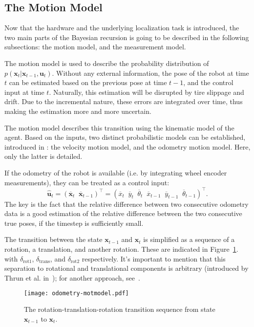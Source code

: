 \subsection{The Motion Model}\label{subsec:mot-model}
Now that the hardware and the underlying localization task is introduced, the two main parts of the
Bayesian recursion is going to be described in the following subsections: the motion model, and the measurement model.

The motion model is used to describe the probability distribution of
$p(\mathbf{x}_t | \mathbf{x}_{t-1},\mathbf{u}_t)$. \linebreak
Without any external information, the pose of the robot at time $t$ can be estimated based on the previous pose
at time $t-1$, and the control input at time $t$. Naturally, this estimation will be disrupted by tire slippage and drift.
Due to the incremental nature, these errors are integrated over time, thus making the estimation more and more
uncertain.

The motion model describes this transition using the kinematic model of the agent.
Based on the inputs, two distinct probabilistic models can be established, introduced in \cite{Thrun2005}: the velocity motion model,
and the odometry motion model. Here, only the latter is detailed.

If the odometry of the robot is available (i.e. by integrating wheel encoder measurements),
they can be treated as a control input:
\begin{equation}
    \hat{\mathbf{u}}_t = (\overline{\mathbf{x}}_t\;\;\overline{\mathbf{x}}_{t-1})^\top =
    \left(\overline{x}_t\;\;\overline{y}_t\;\;\overline{\theta}_t\;\;\overline{x}_{t-1}\;\;\overline{y}_{t-1}\;\;\overline{\theta}_{t-1}\right)^\top.
\end{equation}
The key is the fact that the relative difference between
two consecutive odometry data is a good estimation of the relative difference between
the two consecutive true poses, if the timestep is sufficiently small.

The transition between the state $\mathbf{x}_{t-1}$ and $\mathbf{x}_{t}$ is simplified as a sequence of a rotation, a translation,
and another rotation.
These are indicated in Figure~\ref{fig:odom-mot-model}. with $\delta_{\mathrm{rot1}}$, $\delta_{\mathrm{trans}}$,
and $\delta_{\mathrm{rot2}}$ respectively.
It's important to mention that this separation to rotational and translational components is arbitrary
(introduced by Thrun et al. in~\cite{Thrun2005}); for another approach, see~\cite{Eliazar2004}.
\begin{figure}[htbp]
    \centering
    \texttt{[image: odometry-motmodel.pdf]}
    \caption{The rotation-translation-rotation transition sequence from state $\mathbf{x}_{t-1}$ to $\mathbf{x}_{t}$.}
    \label{fig:odom-mot-model}
\end{figure}

